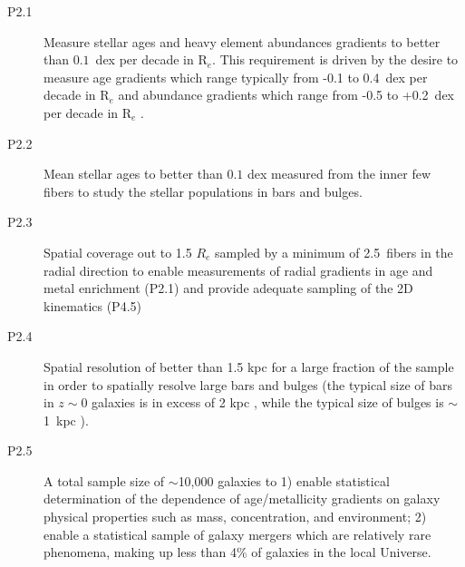 \documentclass[preprint,11pt]{aastex}
\newcommand{\Reff}{{R$_{e}$}}
\begin{document}
\begin{description}

\item[P2.1] Measure stellar ages and heavy element abundances gradients to better
  than $0.1$~dex per decade in \Reff. This requirement is driven by the desire 
  to measure age gradients which range typically from -0.1 to 0.4~dex per decade in R$_e$ \citep{mehlert03,kuntschner10, spolaor10} and 
  abundance gradients which range from -0.5 to 
  +0.2~dex per decade in R$_e$ \citep{mehlert03,spolaor10, koleva11}.

\item[P2.2] Mean stellar ages to better than $0.1$ dex measured 
from the inner few fibers to study the stellar populations in bars 
and bulges.  



\item[P2.3] Spatial coverage out to 1.5 $R_e$ sampled by a minimum of
  2.5~fibers in the radial direction to enable measurements of radial
  gradients in age and metal enrichment (P2.1) and provide adequate
  sampling of the 2D kinematics (P4.5)

\item[P2.4] Spatial resolution of better than 1.5 kpc for a large
  fraction of the sample in order to spatially resolve large bars and
  bulges (the typical size of bars in $z\sim$0 galaxies is in excess
  of 2 kpc \citep{hoyle2011}, while the typical size of bulges is
  $\sim$1~kpc \citep{fisher2010}). 

\item[P2.5] A total sample size of $\sim$10,000 galaxies to 1) enable
  statistical determination of the dependence of age/metallicity
  gradients on galaxy physical properties such as mass, concentration,
  and environment; 2) enable a statistical sample of galaxy mergers
  which are relatively rare phenomena, making up less than 4\% of
  galaxies in the local Universe.

\end{description}
\end{document}
